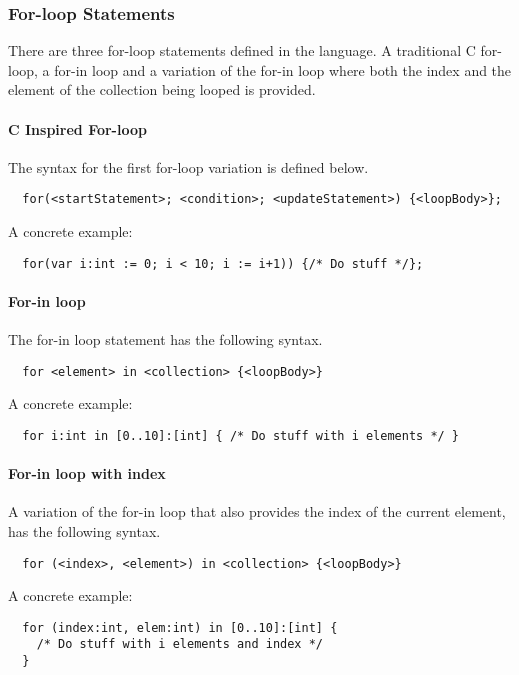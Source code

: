 \subsubsection{For-loop Statements}
\label{subsec:forLoopStatements}

There are three for-loop statements defined in the language. A traditional C for-loop, a for-in loop and a variation of the for-in loop where both the index and the element of the collection being looped is provided.

\paragraph{C Inspired For-loop}
\label{sec:cForLoop}

The syntax for the first for-loop variation is defined below.

\begin{verbatim}
  for(<startStatement>; <condition>; <updateStatement>) {<loopBody>};
\end{verbatim}

A concrete example:

\begin{verbatim}
  for(var i:int := 0; i < 10; i := i+1)) {/* Do stuff */};
\end{verbatim}

\paragraph{For-in loop}
\label{sec:forInLoop}

The for-in loop statement has the following syntax.

\begin{verbatim}
  for <element> in <collection> {<loopBody>}
\end{verbatim}

A concrete example:

\begin{verbatim}
  for i:int in [0..10]:[int] { /* Do stuff with i elements */ }
\end{verbatim}

\paragraph{For-in loop with index}
\label{sec:forInLoopIndex}

A variation of the for-in loop that also provides the index of the current element, has the following syntax.

\begin{verbatim}
  for (<index>, <element>) in <collection> {<loopBody>}
\end{verbatim}

A concrete example:

\begin{verbatim}
  for (index:int, elem:int) in [0..10]:[int] { 
    /* Do stuff with i elements and index */ 
  }
\end{verbatim}
